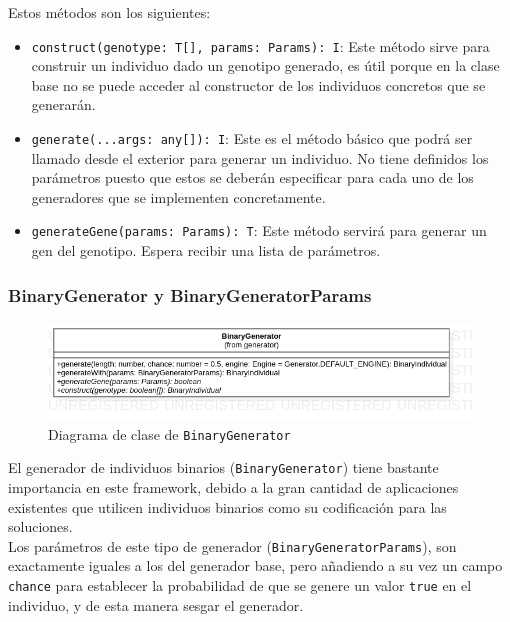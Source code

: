 Estos métodos son los siguientes:

\begin{itemize}
    \item \texttt{construct(genotype: T[], params: Params): I}: Este método sirve para construir un individuo dado un genotipo generado, es útil porque en la clase base no se puede acceder al constructor de los individuos concretos que se generarán.
    \item \texttt{generate(...args: any[]): I}: Este es el método básico que podrá ser llamado desde el exterior para generar un individuo. No tiene definidos los parámetros puesto que estos se deberán especificar para cada uno de los generadores que se implementen concretamente.
    \item \texttt{generateGene(params: Params): T}: Este método servirá para generar un gen del genotipo. Espera recibir una lista de parámetros.
\end{itemize}

\subsubsection{BinaryGenerator y BinaryGeneratorParams}

\begin{figure}[ht]
    \centering
    \includegraphics[scale=0.5]{mem/images/cap-4/4.2.3(Generador)/BinaryGenerator.png}
    \caption{Diagrama de clase de \texttt{BinaryGenerator}}
    \label{fig:generator-uml}
\end{figure}

El generador de individuos binarios (\texttt{BinaryGenerator}) tiene bastante importancia en este framework, debido a la gran cantidad de aplicaciones existentes que utilicen individuos binarios como su codificación para las soluciones. \\

Los parámetros de este tipo de generador (\texttt{BinaryGeneratorParams}), son exactamente iguales a los del generador base, pero añadiendo a su vez un campo \texttt{chance} para establecer la probabilidad de que se genere un valor \texttt{true} en el individuo, y de esta manera sesgar el generador.

